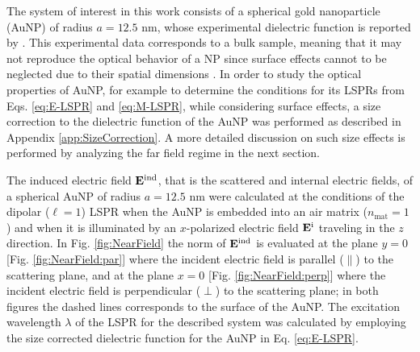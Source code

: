 The system of interest in this work consists of a spherical gold nanoparticle (AuNP) of  radius $a = 12.5$ nm, whose experimental dielectric function is reported by \citeauthor{johnson_optical_1972} \cite{johnson_optical_1972}.  This experimental data corresponds to a bulk sample, meaning that it may not reproduce the optical behavior of a NP since surface effects cannot to be neglected  due to their spatial dimensions \cite{noguez_surface_2007}. In order to study  the optical properties of AuNP, for example to determine the conditions for its LSPRs from   Eqs. \eqref{eq:E-LSPR}  and \eqref{eq:M-LSPR}, while considering  surface effects,  a size correction to the dielectric function of the AuNP was performed as described in Appendix \ref{app:SizeCorrection}. A more detailed discussion on such size effects is performed by analyzing the far field regime in the next section.

The induced electric field $\vb{E}^\text{ind}$, that is the scattered and internal electric fields, of a spherical AuNP of radius $a = 12.5$ nm were calculated at the conditions of the dipolar ($\ell = 1$) LSPR when the AuNP is embedded into an air matrix ($n_\text{mat} = 1$) and when it is illuminated by an $x$-polarized electric field $\vb{E}^\text{i}$ traveling in the $z$ direction. In Fig. \ref{fig:NearField} the norm of $\vb{E}^\text{ind}$ is evaluated at the plane $y = 0$ [Fig. \ref{fig:NearField:par}] where the incident electric field is parallel ($\parallel$) to the scattering plane, and at the plane $x = 0$ [Fig. \ref{fig:NearField:perp}]  where the incident electric field is perpendicular ($\perp$) to the scattering plane; in both figures the dashed lines corresponds to the surface of the AuNP. The excitation wavelength $\lambda$ of the LSPR for the described system was calculated by employing the size corrected dielectric function for the AuNP in Eq. \eqref{eq:E-LSPR}.


